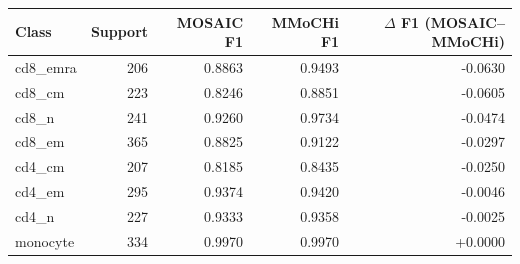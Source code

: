 \begin{tabular}{lrrrr}
\toprule
Class & Support & MOSAIC F1 & MMoCHi F1 & $\Delta$ F1 (MOSAIC--MMoCHi) \\
\midrule
cd8\_emra & 206 & 0.8863 & 0.9493 & -0.0630 \\
cd8\_cm & 223 & 0.8246 & 0.8851 & -0.0605 \\
cd8\_n & 241 & 0.9260 & 0.9734 & -0.0474 \\
cd8\_em & 365 & 0.8825 & 0.9122 & -0.0297 \\
cd4\_cm & 207 & 0.8185 & 0.8435 & -0.0250 \\
cd4\_em & 295 & 0.9374 & 0.9420 & -0.0046 \\
cd4\_n & 227 & 0.9333 & 0.9358 & -0.0025 \\
monocyte & 334 & 0.9970 & 0.9970 & +0.0000 \\
\bottomrule
\end{tabular}
